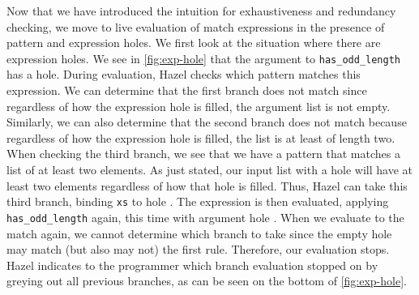 Now that we have introduced the intuition for exhaustiveness and redundancy checking, we move to live evaluation of match expressions in the presence of pattern and expression holes. 
We first look at the situation where there are expression holes. 
We see in \autoref{fig:exp-hole} that the argument to \texttt{has\_odd\_length} has a hole. 
During evaluation, Hazel checks which pattern matches this expression. 
We can determine that the first branch does not match since regardless of how the expression hole is filled, the argument list is not empty. 
Similarly, we can also determine that the second branch does not match because regardless of how the expression hole is filled, the list is at least of length two. 
When checking the third branch, we see that we have a pattern that matches a list of at least two elements.
As just stated, our input list with a hole will have at least two elements regardless of how that hole is filled.
Thus, Hazel can take this third branch, binding \texttt{xs} to hole . 
The expression is then evaluated, applying \texttt{has\_odd\_length} again, this time with argument hole . 
When we evaluate to the match again, we cannot determine which branch to take since the empty hole may match (but also may not) the first rule. 
Therefore, our evaluation stops. Hazel indicates to the programmer which branch evaluation stopped on by greying out all previous branches, as can be seen on the bottom of \autoref{fig:exp-hole}. 

